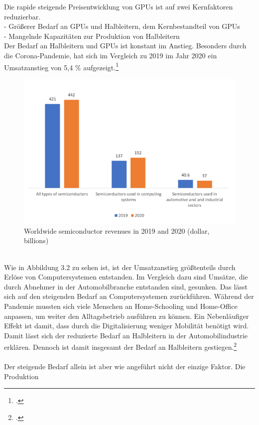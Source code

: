 \documentclass[12pt,toc=bib,toc=listof]{scrreprt}
\begin{document}
Die rapide steigende Preisentwicklung von GPUs ist auf zwei Kernfaktoren reduzierbar.\\
- Größerer Bedarf an GPUs und Halbleitern, dem Kernbestandteil von GPUs\\ %
- Mangelnde Kapazitäten zur Produktion von Halbleitern\\
Der Bedarf an Halbleitern und GPUs ist konstant im Anstieg. Besonders durch die Corona-Pandemie,
hat sich im Vergleich zu 2019 im Jahr 2020 ein Umsatzanstieg von 5,4 \% aufgezeigt.\footcite [Vgl.] []{Voas.2021}
\begin{figure}[h]
  \centering
  \includegraphics[scale=0.9]{Abbildungen/voas1.png} %
  \caption[Voas, Kshetri und DeFranco (2021)]{Worldwide semiconductor revenues in 2019 and 2020 (dollar, billions)}
\end{figure}
\\Wie in Abbildung 3.2 zu sehen ist, ist der Umsatzanstieg größtenteils durch Erlöse von Computersystemen entstanden.
Im Vergleich dazu sind Umsätze, die durch Abnehmer in der Automobilbranche entstanden sind, gesunken.
Das lässt sich auf den steigenden Bedarf an Computersystemen zurückführen. Während der Pandemie mussten sich
viele Menschen an Home-Schooling und Home-Office anpassen, um weiter den Alltagsbetrieb ausführen zu können.
Ein Nebenläufiger Effekt ist damit, dass durch die Digitalisierung weniger Mobilität benötigt wird.
Damit lässt sich der reduzierte Bedarf an Halbleitern in der Automobilindustrie erklären. Dennoch ist damit insgesamt der Bedarf an 
Halbleitern gestiegen.\footcite [Vgl.] []{Voas.2021}
\\\\ Der steigende Bedarf allein ist aber wie angeführt nicht der einzige Faktor. Die Produktion 
\end{document}
